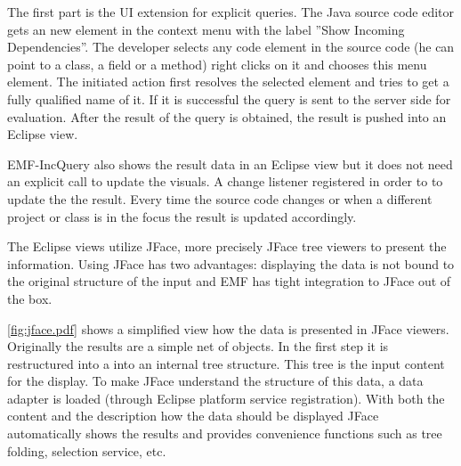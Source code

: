 The first part is the UI extension for explicit queries. The Java source code
editor gets an new element in the context menu with the label ''Show Incoming
Dependencies''. The developer selects any code element in the source code (he
can point to a class, a field or a method) right clicks on it and chooses this
menu element. The initiated action first resolves the selected element and tries
to get a fully qualified name of it. If it is successful the query is sent to
the server side for evaluation. After the result of the query is obtained, the 
result is pushed into an Eclipse view.

EMF-IncQuery also shows the result data in an Eclipse view but it does not 
need an explicit call to update the visuals. A change listener registered in order
to to update the the result. Every time the source code changes or when a different
project or class is in the focus the result is updated accordingly.  

The Eclipse views utilize JFace, more precisely JFace tree viewers to present
the information. Using JFace has two advantages: displaying the data is not
bound to the original structure of the input and EMF has tight integration to
JFace out of the box.


\autoref{fig:jface.pdf} shows a simplified view how the data is presented in
JFace viewers. Originally the results are a simple net of objects. In the first
step it is restructured into a into an internal tree structure. This tree is the
input content for the display. To make JFace understand  the structure of this
data, a data adapter is loaded (through Eclipse platform service registration).
With both the content and the description how the data should be displayed JFace
automatically shows the results and provides convenience functions such as tree
folding, selection service, etc. 





